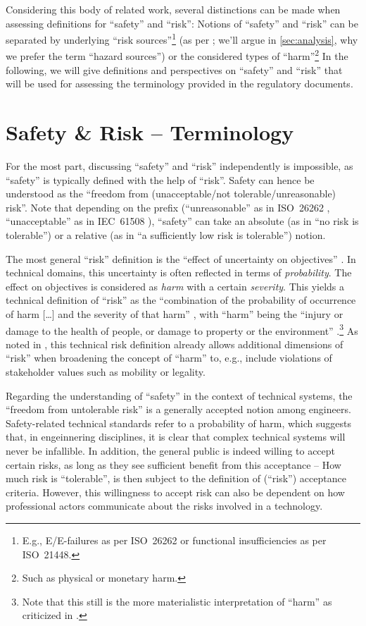 Considering this body of related work, several distinctions can be made when assessing definitions for ``safety'' and ``risk'':
Notions of ``safety'' and ``risk'' can be separated by underlying ``risk sources''\footnote{E.g., E/E-failures as per ISO~26262 or functional insufficiencies as per ISO~21448.} (as per \parencite{christensen2003}; we'll argue in \cref{sec:analysis}, why we prefer the term ``hazard sources'') or the considered types of ``harm''\footnote{Such as physical or monetary harm.}
In the following, we will give definitions and perspectives on ``safety'' and ``risk'' that will be used for assessing the terminology provided in the regulatory documents.

\section{Safety \& Risk -- Terminology}
\label{sec:terminology}
For the most part, discussing ``safety'' and ``risk'' independently is impossible, as ``safety'' is typically defined with the help of ``risk''.
Safety can hence be understood as the ``freedom from (unacceptable/not tolerable/unreasonable) risk''.
Note that depending on the prefix (``unreasonable'' as in ISO~26262 \parencite[p.~21, def.~3.132]{iso2018}, ``unacceptable'' as in IEC~61508 \parencite{iec61508}), ``safety'' can take an absolute (as in ``no risk is tolerable'') or a relative (as in ``a sufficiently low risk is tolerable'') notion.

The most general ``risk'' definition is the ``effect of uncertainty on objectives'' \parencite{iso31000}.
In technical domains, this uncertainty is often reflected in terms of \emph{probability}.
The effect on objectives is considered as \emph{harm} with a certain \emph{severity}.
This yields a technical definition of ``risk'' as the ``combination of the probability of occurrence of harm [\ldots] and the severity of that harm'' \parencite[p.~2, def.~3.9]{iso51}, with ``harm'' being the ``injury or damage to the health of people, or damage to property or the environment'' \parencite[p.~1, def.~3.1]{iso51}.\footnote{Note that this still is the more materialistic interpretation of ``harm'' as criticized in \parencite{koopman2024}.}
As noted in \parencite{salem2024, nolte2024}, this technical risk definition already allows additional dimensions of ``risk'' when broadening the concept of ``harm'' to, e.g., include violations of stakeholder values such as mobility or legality.

Regarding the understanding of ``safety'' in the context of technical systems, the ``freedom from untolerable risk'' is a generally accepted notion among engineers.
Safety-related technical standards refer to a probability of harm, which suggests that, in engeinnering disciplines, it is clear that complex technical systems will never be infallible.
In addition, the general public is indeed willing to accept certain risks, as long as they see sufficient benefit from this acceptance \parencite{grunwald2016} -- How much risk is ``tolerable'', is then subject to the definition of (``risk'') acceptance criteria.
However, this willingness to accept risk can also be dependent on how professional actors communicate about the risks involved in a technology.

